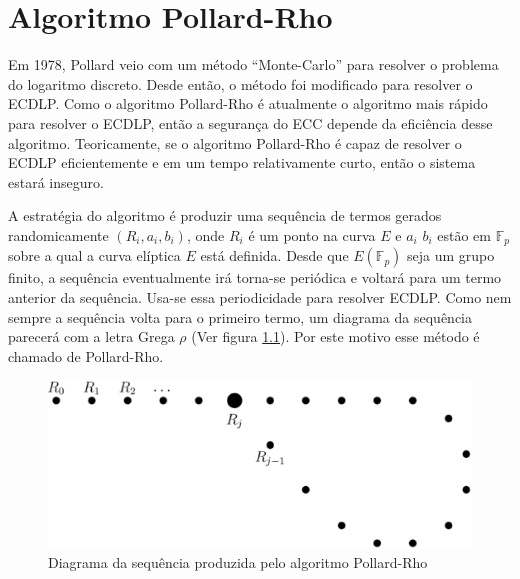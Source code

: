 \chapter{Algoritmo Pollard-Rho}
Em 1978, Pollard veio com um método ``Monte-Carlo'' para resolver o problema do logaritmo discreto. Desde então, o método foi modificado para resolver o ECDLP. Como o algoritmo Pollard-Rho é atualmente o algoritmo mais rápido para resolver o ECDLP, então a segurança do ECC depende da eficiência desse algoritmo. Teoricamente, se o algoritmo Pollard-Rho é capaz de resolver o ECDLP eficientemente e em um tempo relativamente curto, então o sistema estará inseguro. \cite{Mandy:2007}

A estratégia do algoritmo é produzir uma sequência de termos gerados randomicamente $(R_i, a_i, b_i)$, onde \(R_i\) é um ponto na curva \(E\) e \(a_i\)  \(b_i\) estão em $\mathbb{F}_p$ sobre a qual a curva elíptica \(E\) está definida. Desde que $E(\mathbb{F}_p)$ seja um grupo finito, a sequência eventualmente irá torna-se periódica e voltará para um termo anterior da sequência. Usa-se essa periodicidade para resolver ECDLP. Como nem sempre a sequência volta para o primeiro termo, um diagrama da sequência parecerá com a letra Grega \(\rho\) (Ver figura \ref{fig:rho}). Por este motivo esse método é chamado de Pollard-Rho.

\begin{figure}[h]
\centering
\includegraphics[scale=0.4, bb=0 0 888 376]{figuras/rho.eps}
\caption{Diagrama da sequência produzida pelo algoritmo Pollard-Rho}
\label{fig:rho}
\end{figure}
